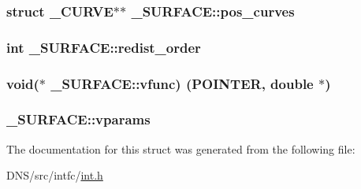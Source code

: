 \subsubsection[{\texorpdfstring{pos\+\_\+curves}{pos_curves}}]{\setlength{\rightskip}{0pt plus 5cm}struct {\bf \+\_\+\+C\+U\+R\+VE}$\ast$$\ast$ \+\_\+\+S\+U\+R\+F\+A\+C\+E\+::pos\+\_\+curves}\hypertarget{struct___s_u_r_f_a_c_e_ab5d92b2042886a759622f98c26eed7e6}{}\label{struct___s_u_r_f_a_c_e_ab5d92b2042886a759622f98c26eed7e6}
\subsubsection[{\texorpdfstring{redist\+\_\+order}{redist_order}}]{\setlength{\rightskip}{0pt plus 5cm}int \+\_\+\+S\+U\+R\+F\+A\+C\+E\+::redist\+\_\+order}\hypertarget{struct___s_u_r_f_a_c_e_a817d62df07aad43cff04d9d9e6093f11}{}\label{struct___s_u_r_f_a_c_e_a817d62df07aad43cff04d9d9e6093f11}
\subsubsection[{\texorpdfstring{vfunc}{vfunc}}]{\setlength{\rightskip}{0pt plus 5cm}void($\ast$ \+\_\+\+S\+U\+R\+F\+A\+C\+E\+::vfunc) ({\bf P\+O\+I\+N\+T\+ER}, double $\ast$)}\hypertarget{struct___s_u_r_f_a_c_e_abf5d0dbd95668b11c594e6eefa94de59}{}\label{struct___s_u_r_f_a_c_e_abf5d0dbd95668b11c594e6eefa94de59}
\subsubsection[{\texorpdfstring{vparams}{vparams}}]{ \+\_\+\+S\+U\+R\+F\+A\+C\+E\+::vparams}\hypertarget{struct___s_u_r_f_a_c_e_a77172d4beb79ce6da7ff93dadde9767b}{}\label{struct___s_u_r_f_a_c_e_a77172d4beb79ce6da7ff93dadde9767b}


The documentation for this struct was generated from the following file\+:\begin{DoxyCompactItemize}
\item 
D\+N\+S/src/intfc/\hyperlink{int_8h}{int.\+h}\end{DoxyCompactItemize}
